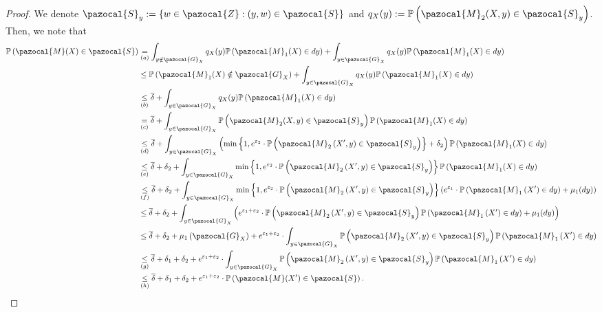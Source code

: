 \documentclass[11pt]{article}
\theoremstyle{definition}
\theoremstyle{plain}
\newcommand{\eps}{{\varepsilon}}
\newcommand{\pG}{\pazocal{G}}
\newcommand{\pM}{\pazocal{M}}
\newcommand{\pS}{\pazocal{S}}
\newcommand{\pZ}{\pazocal{Z}}
\renewcommand{\eps}{\varepsilon}
\begin{document}
\begin{proof}
    
    We denote $\pS_y := \left\{w\in \pZ: (y,w) \in \pS\right\}$ and $q_X(y) := \mathbb{P}\left(\pM_2(X,y) \in \pS_y\right)$. Then, we note that 
    \begin{align}
        \mathbb{P}\left(\pM(X) \in \pS\right) &\underset{(a)}{=} \int_{y\notin \pG_X}q_X(y)\mathbb{P}\left(\pM_1(X) \in dy\right)  + \int_{y\in \pG_X}q_X(y)\mathbb{P}\left(\pM_1(X) \in dy\right)\\
        &\leq \mathbb{P}\left(\pM_1(X) \notin \pG_X\right)  + \int_{y\in \pG_X}q_X(y)\mathbb{P}\left(\pM_1(X) \in dy\right)\\
        &\underset{(b)}{\leq} \overline{\delta} + \int_{y\in \pG_X}q_X(y)\mathbb{P}\left(\pM_1(X) \in dy\right)\\
        &\underset{(c)}{=} \overline{\delta} + \int_{y\in \pG_X}\mathbb{P}\left(\pM_2(X,y) \in \pS_y\right)\mathbb{P}\left(\pM_1(X) \in dy\right)\\
        &\underset{(d)}{\leq} \overline{\delta} + \int_{y\in \pG_X}\left(\min\left\{1,e^{\eps_2}\cdot \mathbb{P}\left(\pM_2\left(X', y\right)\in \pS_y\right) \right\} + \delta_2\right) \mathbb{P}\left(\pM_1(X) \in dy\right)\\
        &\underset{(e)}{\leq} \overline{\delta} + \delta_2 + \int_{y\in \pG_X}\min\left\{1,e^{\eps_2}\cdot \mathbb{P}\left(\pM_2\left(X', y\right)\in \pS_y\right) \right\} \mathbb{P}\left(\pM_1(X) \in dy\right)\\
        &\underset{(f)}{\leq} \overline{\delta} + \delta_2 + \int_{y\in \pG_X}\min\left\{1,e^{\eps_2}\cdot \mathbb{P}\left(\pM_2\left(X', y\right)\in \pS_y\right) \right\} \left(e^{\eps_1}\cdot \mathbb{P}\left(\pM_1\left(X'\right) \in dy\right) + \mu_1(dy)\right)\\
        &\leq \overline{\delta} + \delta_2 + \int_{y\in \pG_X}\left(e^{\eps_1 + \eps_2}\cdot \mathbb{P}\left(\pM_2\left(X', y\right)\in \pS_y\right)\mathbb{P}\left(\pM_1\left(X'\right) \in dy\right) + \mu_1(dy)\right) \\
        &\leq \overline{\delta} + \delta_2 + \mu_1\left(\pG_X\right) + e^{\eps_1 + \eps_2}\cdot \int_{y\in \pG_X}\mathbb{P}\left(\pM_2\left(X', y\right)\in \pS_y\right)\mathbb{P}\left(\pM_1\left(X'\right) \in dy\right)\\
        &\underset{(g)}{\leq} \overline{\delta} + \delta_1 + \delta_2 + e^{\eps_1 + \eps_2}\cdot \int_{y\in \pG_X}\mathbb{P}\left(\pM_2\left(X', y\right)\in \pS_y\right)\mathbb{P}\left(\pM_1\left(X'\right) \in dy\right)\\
        &\underset{(h)}{\leq} \overline{\delta} + \delta_1 + \delta_2 + e^{\eps_1 + \eps_2}\cdot \mathbb{P}\left(\pM(X') \in \pS\right).

\end{align}
\end{proof}
\end{document}
